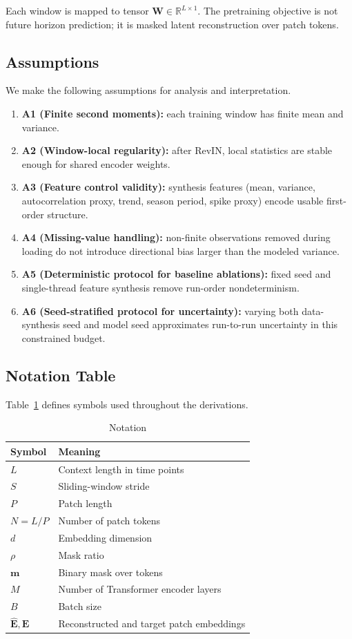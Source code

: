 \documentclass[conference]{IEEEtran}
\begin{document}
Each window is mapped to tensor $\mathbf{W} \in \mathbb{R}^{L \times 1}$. The pretraining objective is not future horizon prediction; it is masked latent reconstruction over patch tokens.

\subsection{Assumptions}
We make the following assumptions for analysis and interpretation.
\begin{enumerate}
    \item \textbf{A1 (Finite second moments):} each training window has finite mean and variance.
    \item \textbf{A2 (Window-local regularity):} after RevIN, local statistics are stable enough for shared encoder weights.
    \item \textbf{A3 (Feature control validity):} synthesis features (mean, variance, autocorrelation proxy, trend, season period, spike proxy) encode usable first-order structure.
    \item \textbf{A4 (Missing-value handling):} non-finite observations removed during loading do not introduce directional bias larger than the modeled variance.
    \item \textbf{A5 (Deterministic protocol for baseline ablations):} fixed seed and single-thread feature synthesis remove run-order nondeterminism.
    \item \textbf{A6 (Seed-stratified protocol for uncertainty):} varying both data-synthesis seed and model seed approximates run-to-run uncertainty in this constrained budget.
\end{enumerate}

\subsection{Notation Table}
Table~\ref{tab:notation} defines symbols used throughout the derivations.

\begin{table}[t]
\caption{Notation}
\label{tab:notation}
\centering
\begin{tabular}{ll}
\toprule
Symbol & Meaning \\
\midrule
$L$ & Context length in time points \\
$S$ & Sliding-window stride \\
$P$ & Patch length \\
$N=L/P$ & Number of patch tokens \\
$d$ & Embedding dimension \\
$\rho$ & Mask ratio \\
$\mathbf{m}$ & Binary mask over tokens \\
$M$ & Number of Transformer encoder layers \\
$B$ & Batch size \\
$\hat{\mathbf{E}},\mathbf{E}$ & Reconstructed and target patch embeddings \\
\bottomrule
\end{tabular}
\end{table}
\end{document}
